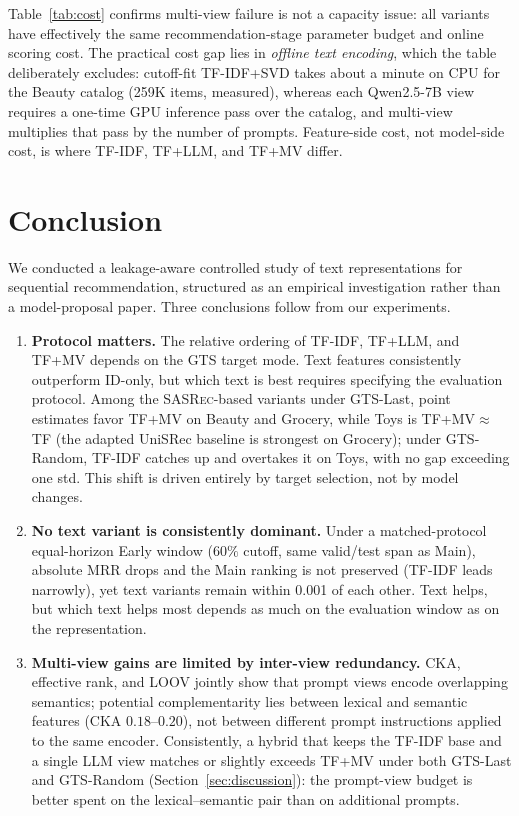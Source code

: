 \documentclass[sigconf,natbib=true,anonymous]{acmart}
\newcommand{\tfidf}{\textsc{TF-IDF}\xspace}
\newcommand{\tfllm}{\textsc{TF+LLM}\xspace}
\newcommand{\tfmv}{\textsc{TF+MV}\xspace}
\newcommand{\base}{\textsc{SASRec}\xspace}
\begin{document}
Table~\ref{tab:cost} confirms multi-view failure is not a capacity issue: all variants have effectively the same recommendation-stage parameter budget and online scoring cost.
The practical cost gap lies in \emph{offline text encoding}, which the table deliberately excludes: cutoff-fit \tfidf+SVD takes about a minute on CPU for the Beauty catalog (259K items, measured), whereas each Qwen2.5-7B view requires a one-time GPU inference pass over the catalog, and multi-view multiplies that pass by the number of prompts.
Feature-side cost, not model-side cost, is where \tfidf, \tfllm, and \tfmv differ.

\section{Conclusion}
\label{sec:conclusion}

We conducted a leakage-aware controlled study of text representations for sequential recommendation, structured as an empirical investigation rather than a model-proposal paper.
Three conclusions follow from our experiments.

\begin{enumerate}[leftmargin=*,itemsep=1pt]
\item \textbf{Protocol matters.}
The relative ordering of \tfidf, \tfllm, and \tfmv depends on the GTS target mode.
Text features consistently outperform ID-only, but which text is best requires specifying the evaluation protocol.
Among the \base-based variants under GTS-Last, point estimates favor \tfmv on Beauty and Grocery, while Toys is TF+MV${}\approx{}$TF (the adapted UniSRec baseline is strongest on Grocery); under GTS-Random, \tfidf catches up and overtakes it on Toys, with no gap exceeding one std. This shift is driven entirely by target selection, not by model changes.
\item \textbf{No text variant is consistently dominant.}
Under a matched-protocol equal-horizon Early window ($60\%$ cutoff, same valid/test span as Main), absolute MRR drops and the Main ranking is not preserved (\tfidf leads narrowly), yet text variants remain within 0.001 of each other.
Text helps, but which text helps most depends as much on the evaluation window as on the representation.
\item \textbf{Multi-view gains are limited by inter-view redundancy.}
CKA, effective rank, and LOOV jointly show that prompt views encode overlapping semantics; potential complementarity lies between lexical and semantic features (CKA $0.18$--$0.20$), not between different prompt instructions applied to the same encoder.
Consistently, a hybrid that keeps the \tfidf base and a single LLM view matches or slightly exceeds \tfmv under both GTS-Last and GTS-Random (Section~\ref{sec:discussion}): the prompt-view budget is better spent on the lexical--semantic pair than on additional prompts.
\end{enumerate}
\end{document}
